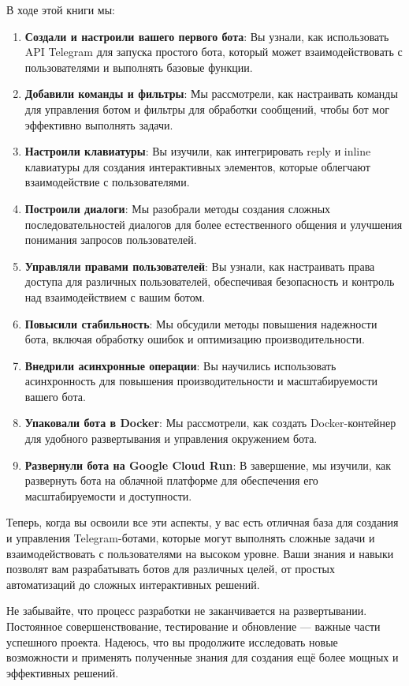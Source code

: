 \documentclass[
]{book}
\providecommand{\tightlist}{%
  \setlength{\itemsep}{0pt}\setlength{\parskip}{0pt}}
\begin{document}
В ходе этой книги мы:

\begin{enumerate}
\def\labelenumi{\arabic{enumi}.}
\tightlist
\item
  \textbf{Создали и настроили вашего первого бота}: Вы узнали, как использовать API Telegram для запуска простого бота, который может взаимодействовать с пользователями и выполнять базовые функции.
\item
  \textbf{Добавили команды и фильтры}: Мы рассмотрели, как настраивать команды для управления ботом и фильтры для обработки сообщений, чтобы бот мог эффективно выполнять задачи.
\item
  \textbf{Настроили клавиатуры}: Вы изучили, как интегрировать reply и inline клавиатуры для создания интерактивных элементов, которые облегчают взаимодействие с пользователями.
\item
  \textbf{Построили диалоги}: Мы разобрали методы создания сложных последовательностей диалогов для более естественного общения и улучшения понимания запросов пользователей.
\item
  \textbf{Управляли правами пользователей}: Вы узнали, как настраивать права доступа для различных пользователей, обеспечивая безопасность и контроль над взаимодействием с вашим ботом.
\item
  \textbf{Повысили стабильность}: Мы обсудили методы повышения надежности бота, включая обработку ошибок и оптимизацию производительности.
\item
  \textbf{Внедрили асинхронные операции}: Вы научились использовать асинхронность для повышения производительности и масштабируемости вашего бота.
\item
  \textbf{Упаковали бота в Docker}: Мы рассмотрели, как создать Docker-контейнер для удобного развертывания и управления окружением бота.
\item
  \textbf{Развернули бота на Google Cloud Run}: В завершение, мы изучили, как развернуть бота на облачной платформе для обеспечения его масштабируемости и доступности.
\end{enumerate}

Теперь, когда вы освоили все эти аспекты, у вас есть отличная база для создания и управления Telegram-ботами, которые могут выполнять сложные задачи и взаимодействовать с пользователями на высоком уровне. Ваши знания и навыки позволят вам разрабатывать ботов для различных целей, от простых автоматизаций до сложных интерактивных решений.

Не забывайте, что процесс разработки не заканчивается на развертывании. Постоянное совершенствование, тестирование и обновление --- важные части успешного проекта. Надеюсь, что вы продолжите исследовать новые возможности и применять полученные знания для создания ещё более мощных и эффективных решений.
\end{document}
